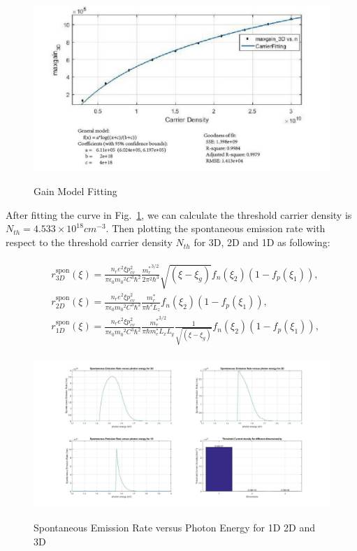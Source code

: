 \begin{figure}
  \caption{Gain Model Fitting}
  \centering
  \includegraphics[width=\textwidth]{pictures/LT/gainModelFit_Anoted}
  \label{gainModelFit_Anoted}
\end{figure}

After fitting the curve in Fig.~\ref{gainModelFit_Anoted}, we can calculate the
threshold carrier density is $N_{th} = 4.533\times10^{18} cm^{-3}$. Then
plotting the spontaneous emission rate with respect to the threshold carrier
density $N_{th}$ for 3D, 2D and 1D as following: 

\begin{eqnarray}
\begin{aligned}
& r_{3D}^{\mathrm{spon}}(\xi)=\frac{n_re^2\xi{p_{cv}^2}}{{\pi}\epsilon_0{m_0}^2C^3{\hbar^2}}\frac{{m_r^\ast}^{3/2}}{2\pi^2\hbar^3}{\sqrt{(\xi-\xi_g)}}f_n(\xi_2)(1-f_p(\xi_1)),
\\
& r_{2D}^{\mathrm{spon}}(\xi)=\frac{n_re^2\xi{p_{cv}^2}}{{\pi}\epsilon_0{m_0}^2C^3{\hbar^2}}\frac{{m_r^\ast}}{\pi\hbar^2L_z}f_n(\xi_2)(1-f_p(\xi_1)),
\\
& r_{1D}^{\mathrm{spon}}(\xi)=\frac{n_re^2\xi{p_{cv}^2}}{{\pi}\epsilon_0{m_0}^2C^3{\hbar^2}}\frac{{m_r^\ast}^{3/2}}{\pi\hbar{m_e^\ast}L_xL_y}\frac{1}{\sqrt{(\xi-\xi_g)}}f_n(\xi_2)(1-f_p(\xi_1)),
\end{aligned}
\label{eq:six}
\end{eqnarray}

\begin{figure}
  \caption{Spontaneous Emission Rate versus Photon Energy for 1D 2D and 3D}
  \centering
  \includegraphics[width=\textwidth]{pictures/LT/sponrate}
  \label{sponrate}
\end{figure}

